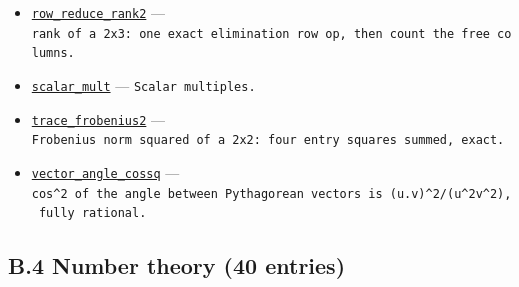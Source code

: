 \documentclass[
  10pt,
]{article}
\begin{document}
\begin{itemize}
  \href{../generation_1/I1/algos_gen1_big.py}{\texttt{rotate\_twice}}
  --- \texttt{Two\ 90-degree\ rotations\ negate.}
\item
  \href{../generation_1/I3/algos_i3.py}{\texttt{row\_reduce\_rank2}} ---
  \texttt{rank\ of\ a\ 2x3:\ one\ exact\ elimination\ row\ op,\ then\ count\ the\ free\ columns.}
\item
  \href{../generation_1/I1/algos_gen1_big.py}{\texttt{scalar\_mult}} ---
  \texttt{Scalar\ multiples.}
\item
  \href{../generation_1/I3/algos_i3.py}{\texttt{trace\_frobenius2}} ---
  \texttt{Frobenius\ norm\ squared\ of\ a\ 2x2:\ four\ entry\ squares\ summed,\ exact.}
\item
  \href{../generation_1/I3/algos_i3.py}{\texttt{vector\_angle\_cossq}}
  ---
  \texttt{cos\^{}2\ of\ the\ angle\ between\ Pythagorean\ vectors\ is\ (u.v)\^{}2/(\textbar{}u\textbar{}\^{}2\textbar{}v\textbar{}\^{}2),\ fully\ rational.}
\end{itemize}

\subsection{B.4 Number theory (40
entries)}\label{b.4-number-theory-40-entries}
\end{document}
